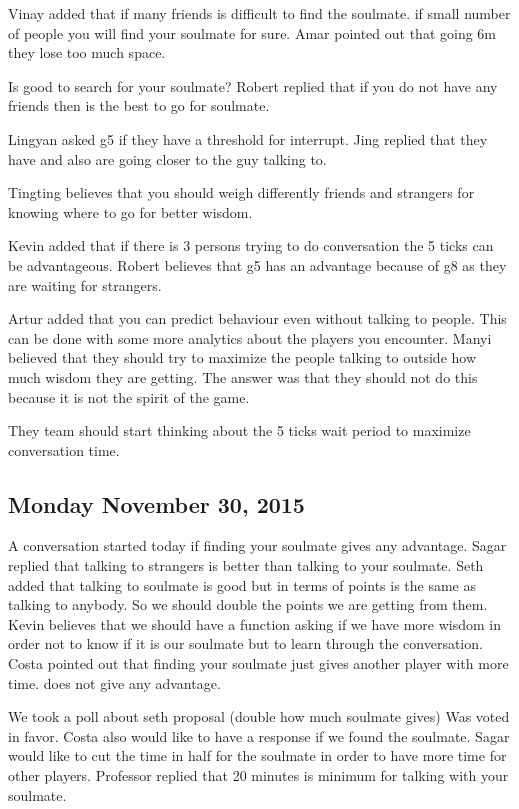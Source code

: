 Vinay added that if many friends is difficult to find the soulmate. if small number of people you will find your soulmate for sure.
Amar pointed out that going 6m they lose too much space.

Is good to search for your soulmate?
Robert replied that if you do not have any friends then is the best to go for soulmate.

Lingyan asked g5 if they have a threshold for interrupt.
Jing replied that they have and also are going closer to the guy talking to.

Tingting believes that you should weigh differently friends and strangers for knowing where to go for better wisdom.

Kevin added that if there is 3 persons trying to do conversation the 5 ticks can be advantageous.
Robert believes that g5 has an advantage because of g8 as they are waiting for strangers.

Artur added that you can predict behaviour even without talking to people. This can be done with some more analytics about the players you encounter.
Manyi believed that they should try to maximize the people talking to outside how much wisdom they are getting. The answer was that they should not do this because it is not the spirit of the game.

They team should start thinking about the 5 ticks wait period to maximize conversation time.

\subsection{Monday November 30, 2015}
A conversation started today if finding your soulmate gives any advantage.
Sagar replied that talking to strangers is better than talking to your soulmate.
Seth added that talking to soulmate is good but in terms of points is the same as talking to anybody. So we should double the points we are getting from them.
Kevin believes that we should have a function asking if we have more wisdom in order not to know if it is our soulmate but to learn through the conversation.
Costa pointed out that finding your soulmate just gives another player with more time. does not give any advantage.

We took a poll about seth proposal (double how much soulmate gives)
Was voted in favor.
Costa also would like to have a response if we found the soulmate.
Sagar would like to cut the time in half for the soulmate in order to have more 
time for other players.
Professor replied that 20 minutes is minimum for talking with your soulmate.

